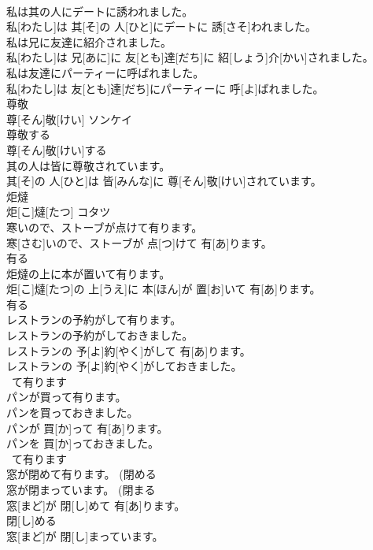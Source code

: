 \documentclass[8pt]{extreport}
\begin{document}
\begin{CJK}{UTF8}{min}
\\	私は其の人にデートに誘われました。	
\\	私[わたし]は 其[そ]の 人[ひと]にデートに 誘[さそ]われました。 
\\	私は兄に友達に紹介されました。	
\\	私[わたし]は 兄[あに]に 友[とも]達[だち]に 紹[しょう]介[かい]されました。 
\\	私は友達にパーティーに呼ばれました。	
\\	私[わたし]は 友[とも]達[だち]にパーティーに 呼[よ]ばれました。 
\\	尊敬	
\\	尊[そん]敬[けい]	ソンケイ
\\	尊敬する	
\\	尊[そん]敬[けい]する
\\	其の人は皆に尊敬されています。	
\\	其[そ]の 人[ひと]は 皆[みんな]に 尊[そん]敬[けい]されています。 
\\	炬燵	
\\	炬[こ]燵[たつ]	コタツ
\\	寒いので、ストーブが点けて有ります。	
\\	寒[さむ]いので、ストーブが 点[つ]けて 有[あ]ります。 
\\	有る 
\\	炬燵の上に本が置いて有ります。	
\\	炬[こ]燵[たつ]の 上[うえ]に 本[ほん]が 置[お]いて 有[あ]ります。 
\\	有る 
\\	レストランの予約がして有ります。 
\\	レストランの予約がしておきました。	
\\	レストランの 予[よ]約[やく]がして 有[あ]ります。 
\\	レストランの 予[よ]約[やく]がしておきました。 
\\	~て有ります 
\\	パンが買って有ります。 
\\	パンを買っておきました。	
\\	パンが 買[か]って 有[あ]ります。 
\\	パンを 買[か]っておきました。 
\\	~て有ります 
\\	窓が閉めて有ります。 (閉める 
\\	窓が閉まっています。 (閉まる 
\\	窓[まど]が 閉[し]めて 有[あ]ります。 
\\	閉[し]める 
\\	窓[まど]が 閉[し]まっています。 

\end{CJK}
\end{document}
